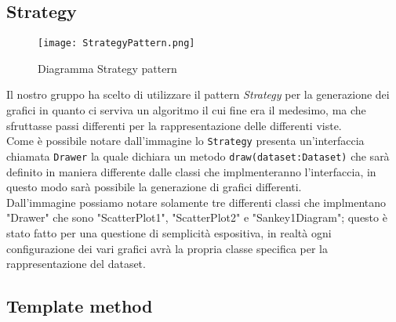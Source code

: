 \subsection{Strategy}
\begin{figure}[H]
	\centering
	\texttt{[image: StrategyPattern.png]}
	\caption{Diagramma Strategy pattern}
  \end{figure}
Il nostro gruppo ha scelto di utilizzare il pattern \textit{Strategy} per la generazione dei grafici in quanto ci serviva un algoritmo il cui fine era il medesimo, ma che sfruttasse passi differenti per la rappresentazione delle differenti viste.\\
Come è possibile notare dall'immagine lo \texttt{Strategy} presenta un'interfaccia chiamata \texttt{Drawer} la quale dichiara un metodo \texttt{draw(dataset:Dataset)} che sarà definito in maniera differente dalle classi che implmenteranno l'interfaccia, in questo modo sarà possibile la generazione di grafici differenti.\\
Dall'immagine possiamo notare solamente tre differenti classi che implmentano "Drawer" che sono "ScatterPlot1", "ScatterPlot2" e "Sankey1Diagram"; questo è stato fatto per una questione di semplicità espositiva, in realtà ogni configurazione dei vari grafici avrà la propria classe specifica per la rappresentazione del dataset. \\

\subsection{Template method}

